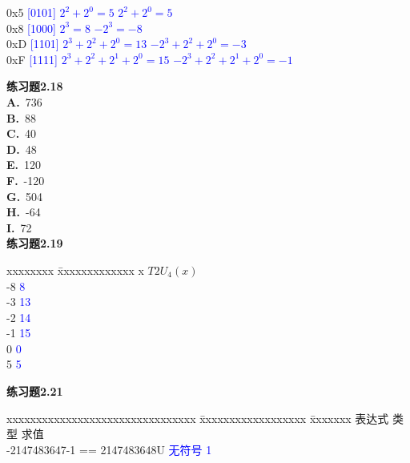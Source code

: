 \documentclass{article}
\begin{document}
\begin{CJK}{UTF8}{uyhei}
\begin{tabbing}
	\hspace{1em}0x5	\hspace{3.7em}\textcolor{blue}{[0101]}	\>	\textcolor{blue}{$2^2+2^0=5$}		\>	\textcolor{blue}{$2^2+2^0=5$}		\\
	\hspace{1em}0x8	\hspace{3.7em}\textcolor{blue}{[1000]}	\>	\textcolor{blue}{$2^3=8$}		\>	\textcolor{blue}{$-2^3=-8$}		\\
	\hspace{1em}0xD	\hspace{3.4em}\textcolor{blue}{[1101]}	\>	\textcolor{blue}{$2^3+2^2+2^0=13$}	\>	\textcolor{blue}{$-2^3+2^2+2^0=-3$}	\\
	\hspace{1em}0xF	\hspace{3.5em}\textcolor{blue}{[1111]}	\>	\textcolor{blue}{$2^3+2^2+2^1+2^0=15$}	\>	\textcolor{blue}{$-2^3+2^2+2^1+2^0=-1$}	\\[1ex]
\end{tabbing}
\textbf{练习题2.18}\\[1ex]
\textbf{A.}\ 736 	\\
\textbf{B.}\ 88 	\\
\textbf{C.}\ 40		\\
\textbf{D.}\ 48		\\
\textbf{E.}\ 120	\\
\textbf{F.}\ -120	\\
\textbf{G.}\ 504	\\
\textbf{H.}\ -64	\\
\textbf{I.}\ 72		\\[5ex]
\textbf{练习题2.19}
\begin{tabbing}
	xxxxxxxx	\=	xxxxxxxxxxxxx		\kill
	x		\>	$T2U_4(x)$		\\
	-8		\>	\textcolor{blue}{8}	\\
	-3		\>	\textcolor{blue}{13}	\\
	-2		\>	\textcolor{blue}{14}	\\
	-1		\>	\textcolor{blue}{15}	\\
	0		\>	\textcolor{blue}{0}	\\
	5		\>	\textcolor{blue}{5}	\\
\end{tabbing}
\textbf{练习题2.21}
\begin{tabbing}
	xxxxxxxxxxxxxxxxxxxxxxxxxxxxxxxx	\=	xxxxxxxxxxxxxxxxxx		\=	xxxxxxx	\kill
	表达式					\>	类型			\>	求值				\\[0.5ex]
	-2147483647-1 == 2147483648U		\>	\textcolor{blue}{无符号}	\>	\textcolor{blue}1	\\

\end{tabbing}
\end{CJK}
\end{document}
